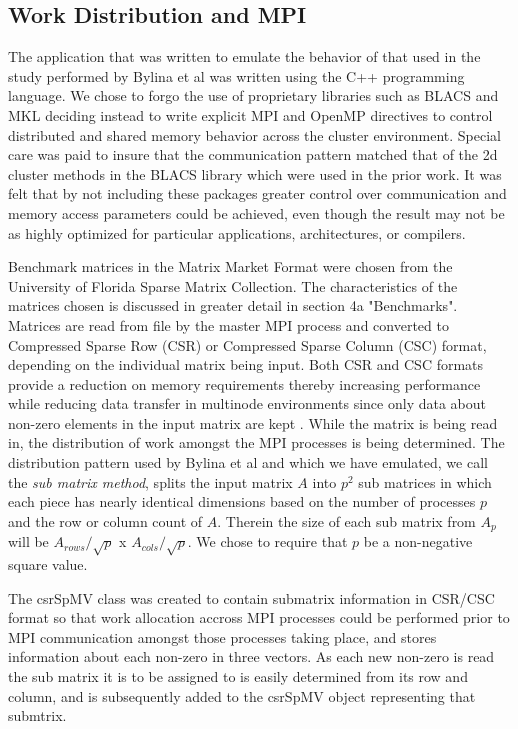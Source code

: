 \subsection{Work Distribution and MPI}

The application that was written to emulate the behavior of that used in the study performed by Bylina et al was written using the C++ programming language.
We chose to forgo the use of proprietary libraries such as BLACS and MKL deciding instead to write explicit MPI and OpenMP directives to control distributed and shared memory behavior across the cluster environment. 
Special care was paid to insure that the communication pattern matched that of the 2d cluster methods in the BLACS library which were used in the prior work.
It was felt that by not including these packages greater control over communication and memory access parameters could be achieved, even though the result may not be as highly optimized for particular applications, architectures, or compilers. 


Benchmark matrices in the Matrix Market Format were chosen from the University of Florida Sparse Matrix Collection. The characteristics of the matrices chosen is discussed in greater detail in section 4a "Benchmarks". 
Matrices are read from file by the master MPI process and converted to Compressed Sparse Row (CSR) or Compressed Sparse Column (CSC) format, depending on the individual matrix being input.
Both CSR and CSC formats provide a reduction on memory requirements thereby increasing performance while reducing data transfer in multinode environments since only data about non-zero elements in the input matrix are kept . 
While the matrix is being read in, the distribution of work amongst the MPI processes is being determined. 
The distribution pattern used by Bylina et al and which we have emulated, we call the \emph{sub matrix method}, splits the input matrix $A$ into $p^2$ sub matrices in which each piece has nearly identical dimensions based on the number of processes $p$ and the row or column count of $A$.
Therein the size of each sub matrix from $A_p$ will be $A_{rows}/\sqrt{p}$  x $A_{cols}/\sqrt{p}$. 
We chose to require that $p$ be a non-negative square value.

The csrSpMV class was created to contain submatrix information in CSR/CSC format so that work allocation accross MPI processes could be performed prior to MPI communication amongst those processes taking place, and stores information about each non-zero in three vectors. 
As each new non-zero is read the sub matrix it is to be assigned to is easily determined from its row and column, and is subsequently added to the csrSpMV object representing that submtrix. 


